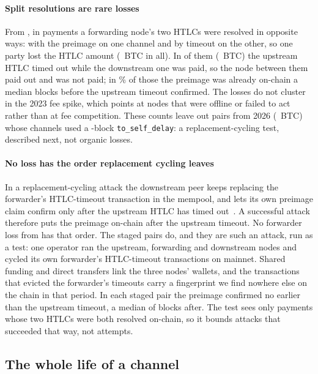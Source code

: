 \paragraph{Split resolutions are rare losses}
From \SplitResFromYear, in \SplitResPayments{} payments a forwarding node's two HTLCs were resolved in opposite ways:
with the preimage on one channel and by timeout on the other, so one party lost the HTLC amount (\SplitResBtc~BTC in
all). In \SplitResForwarderPayments{} of them (\SplitResForwarderBtc~BTC) the upstream HTLC timed out while the
downstream one was paid, so the node between them paid out and was not paid; in \SplitResPreimageFirstPct\% of those
the preimage was already on-chain a median \SplitResGapMed{} blocks before the upstream timeout confirmed. The losses
do not cluster in the 2023 fee spike, which points at nodes that were offline or failed to act rather than at fee
competition. These counts leave out \SplitResStagedPairs{} pairs from 2026 (\SplitResStagedBtc~BTC) whose channels
used a \SplitResStagedToSelfDelay-block \texttt{to\_self\_delay}: a replacement-cycling test, described next, not
organic losses.

\paragraph{No loss has the order replacement cycling leaves}
In a replacement-cycling attack the downstream peer keeps replacing the forwarder's HTLC-timeout transaction in the
mempool, and lets its own preimage claim confirm only after the upstream HTLC has timed
out~\cite{riard2023replacement}. A successful attack therefore puts the preimage on-chain after the upstream timeout.
No forwarder loss from \SplitResFromYear{} has that order. The staged pairs do, and they are such an attack, run as a
test: one operator ran the upstream, forwarding and downstream nodes and cycled its own forwarder's HTLC-timeout
transactions on mainnet. Shared funding and direct transfers link the three nodes' wallets, and the transactions that
evicted the forwarder's timeouts carry a fingerprint we find nowhere else on the chain in that period. In each staged
pair the preimage confirmed no earlier than the upstream timeout, a median of \SplitResStagedPreimageAfterMed{} blocks
after. The test sees only
payments whose two HTLCs were both resolved on-chain, so it bounds attacks that succeeded that way, not attempts.

\subsection{The whole life of a channel}
\label{sec:lifecycle}

